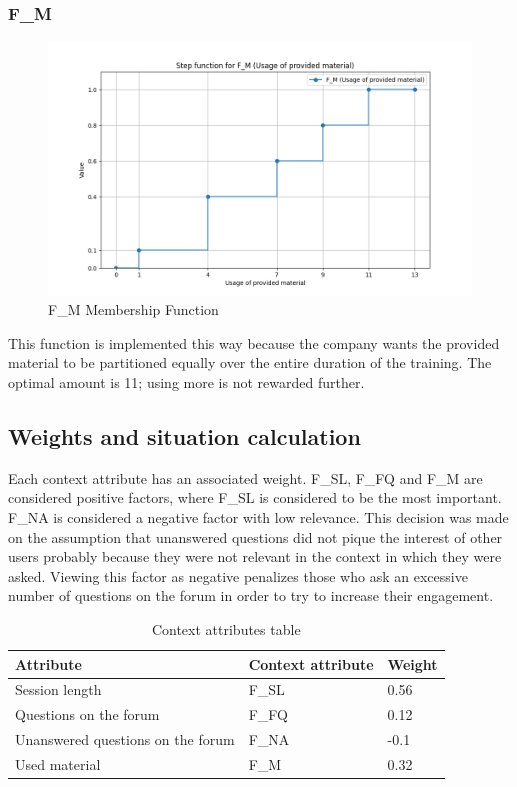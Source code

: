 \subsubsection{F\_M}
\begin{figure}[H]
    \centering
    \includegraphics[width=\textwidth]{./assets/plot_F_M.png}
    \caption{F\_M Membership Function}
    \label{fig:plot_F_M}
\end{figure}
This function is implemented this way because the company wants the provided material to be partitioned equally over the entire duration of the training. The optimal amount is 11; using more is not rewarded further.

\subsection{Weights and situation calculation}
Each context attribute has an associated weight. F\_SL, F\_FQ and F\_M are considered positive factors, where F\_SL is considered to be the most important. F\_NA is considered a negative factor with low relevance. This decision was made on the assumption that unanswered questions did not pique the interest of other users probably because they were not relevant in the context in which they were asked. Viewing this factor as negative penalizes those who ask an excessive number of questions on the forum in order to try to increase their engagement.

\begin{table}[H]
    \begin{center}
    \begin{tabular}{ | m{7cm} | m{4cm}| m{4cm} | } 
      \hline
      \textbf{Attribute} & \textbf{Context attribute}  & \textbf{Weight}  \\ 
      \hline
      Session length & F\_SL & 0.56 \\ 
      \hline
      Questions on the forum & F\_FQ & 0.12 \\
      \hline
      Unanswered questions on the forum & F\_NA & -0.1 \\
      \hline
      Used material & F\_M & 0.32 \\
      \hline
    \end{tabular}
    \end{center}
    \caption{Context attributes table}
\end{table}

